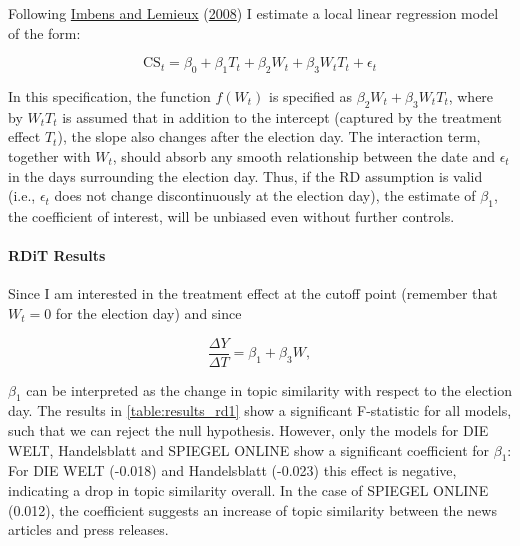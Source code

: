 \documentclass[
  12pt,
]{article}
\begin{document}
Following \protect\hyperlink{ref-imbens_regression_2008}{Imbens and
Lemieux} (\protect\hyperlink{ref-imbens_regression_2008}{2008}) I
estimate a local linear regression model of the form:

\[
\text{CS}_{t}=\beta_0+\beta_1T_t+\beta_2W_t+\beta_3W_tT_t+\epsilon_t
\]

In this specification, the function \(f(W_t)\) is specified as
\(\beta_2W_t+\beta_3W_tT_t\), where by \(W_tT_t\) is assumed that in
addition to the intercept (captured by the treatment effect \(T_t\)),
the slope also changes after the election day. The interaction term,
together with \(W_t\), should absorb any smooth relationship between the
date and \(\epsilon_t\) in the days surrounding the election day. Thus,
if the RD assumption is valid (i.e., \(\epsilon_t\) does not change
discontinuously at the election day), the estimate of \(\beta_1\), the
coefficient of interest, will be unbiased even without further controls.

\hypertarget{rdit-results}{%
\paragraph{RDiT Results}\label{rdit-results}}

Since I am interested in the treatment effect at the cutoff point
(remember that \(W_t=0\) for the election day) and since

\[
\frac{\Delta Y}{\Delta T}=\beta_1+\beta_3W,
\]

\(\beta_1\) can be interpreted as the change in topic similarity with
respect to the election day. The results in \autoref{table:results_rd1}
show a significant F-statistic for all models, such that we can reject
the null hypothesis. However, only the models for DIE WELT, Handelsblatt
and SPIEGEL ONLINE show a significant coefficient for \(\beta_1\): For
DIE WELT (-0.018) and Handelsblatt (-0.023) this effect is negative,
indicating a drop in topic similarity overall. In the case of SPIEGEL
ONLINE (0.012), the coefficient suggests an increase of topic similarity
between the news articles and press releases.
\end{document}
